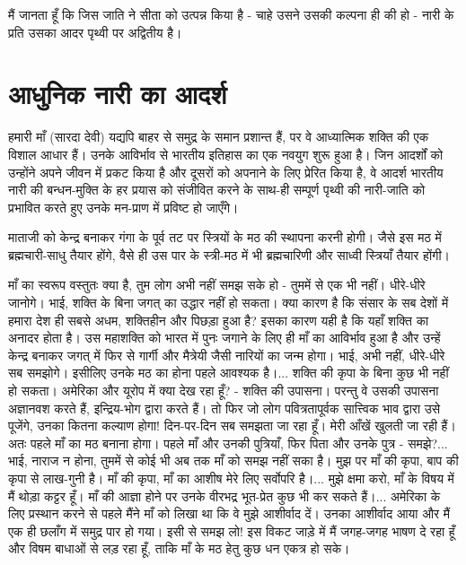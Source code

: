 मैं जानता हूँ कि जिस जाति ने सीता को उत्पन्न किया है - चाहे उसने उसकी कल्पना ही की हो - नारी के प्रति उसका आदर पृथ्वी पर अद्वितीय है।


\section*{आधुनिक नारी का आदर्श}


हमारी माँ (सारदा देवी) यद्यपि बाहर से समुद्र के समान प्रशान्त हैं, पर वे आध्यात्मिक शक्ति की एक विशाल आधार हैं। उनके आविर्भाव से भारतीय इतिहास का एक नवयुग शुरू हुआ है। जिन आदर्शों को उन्होंने अपने जीवन में प्रकट किया है और दूसरों को अपनाने के लिए प्रेरित किया है, वे आदर्श भारतीय नारी की बन्धन-मुक्ति के हर प्रयास को संजीवित करने के साथ-ही सम्पूर्ण पृथ्वी की नारी-जाति को प्रभावित करते हुए उनके मन-प्राण में प्रविष्ट हो जाएँगे। 

माताजी को केन्द्र बनाकर गंगा के पूर्व तट पर स्त्रियों के मठ की स्थापना करनी होगी। जैसे इस मठ में ब्रह्मचारी-साधु तैयार होंगे, वैसे ही उस पार के स्त्री-मठ में भी ब्रह्मचारिणी और साध्वी स्त्रियाँ तैयार होंगी। 

माँ का स्वरूप वस्तुतः क्या है, तुम लोग अभी नहीं समझ सके हो - तुममें से एक भी नहीं। धीरे-धीरे जानोगे। भाई, शक्ति के बिना जगत् का उद्धार नहीं हो सकता। क्या कारण है कि संसार के सब देशों में हमारा देश ही सबसे अधम, शक्तिहीन और पिछड़ा हुआ है? इसका कारण यही है कि यहाँ शक्ति का अनादर होता है। उस महाशक्ति को भारत में पुनः जगाने के लिए ही माँ का आविर्भाव हुआ है और उन्हें केन्द्र बनाकर जगत् में फिर से गार्गी और मैत्रेयी जैसी नारियों का जन्म होगा। भाई, अभी नहीं, धीरे-धीरे सब समझोगे। इसीलिए उनके मठ का होना पहले आवश्यक है।... शक्ति की कृपा के बिना कुछ भी नहीं हो सकता। अमेरिका और यूरोप में क्या देख रहा हूँ? - शक्ति की उपासना। परन्तु वे उसकी उपासना अज्ञानवश करते हैं, इन्द्रिय-भोग द्वारा करते हैं। तो फिर जो लोग पवित्रतापूर्वक सात्त्विक भाव द्वारा उसे पूजेंगे, उनका कितना कल्याण होगा! दिन-पर-दिन सब समझता जा रहा हूँ। मेरी आँखें खुलती जा रही हैं। अतः पहले माँ का मठ बनाना होगा। पहले माँ और उनकी पुत्रियाँ, फिर पिता और उनके पुत्र - समझे?... भाई, नाराज न होना, तुममें से कोई भी अब तक माँ को समझ नहीं सका है। मुझ पर माँ की कृपा, बाप की कृपा से लाख-गुनी है। माँ की कृपा, माँ का आशीष मेरे लिए सर्वोपरि है।... मुझे क्षमा करो, माँ के विषय में मैं थोड़ा कट्टर हूँ। माँ की आज्ञा होने पर उनके वीरभद्र भूत-प्रेत कुछ भी कर सकते हैं।... अमेरिका के लिए प्रस्थान करने से पहले मैंने माँ को लिखा था कि वे मुझे आशीर्वाद दें। उनका आशीर्वाद आया और मैं एक ही छलाँग में समुद्र पार हो गया। इसी से समझ लो! इस विकट जाड़े में मैं जगह-जगह भाषण दे रहा हूँ और विषम बाधाओं से लड़ रहा हूँ, ताकि माँ के मठ हेतु कुछ धन एकत्र हो सके। 

